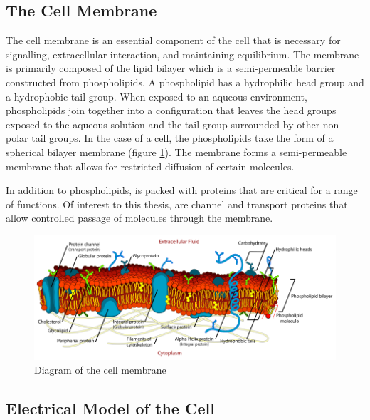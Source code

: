  \subsection{The Cell Membrane}
 \par The cell membrane is an essential component of the cell that is necessary for signalling, extracellular interaction, and maintaining equilibrium. The membrane is primarily composed of the lipid bilayer which is a semi-permeable barrier constructed from phospholipids. A phospholipid has a hydrophilic head group and a hydrophobic tail group. When exposed to an aqueous environment, phospholipids join together into a configuration that leaves the head groups exposed to the aqueous solution and the tail group surrounded by other non-polar tail groups. In the case of a cell, the phospholipids take the form of a spherical bilayer membrane (figure \ref{fig:cell_membrane}). The membrane forms a semi-permeable membrane that allows for restricted diffusion of certain molecules. 
 
 \par In addition to phospholipids, is packed with proteins that are critical for a range of functions. Of interest to this thesis, are channel and transport proteins that allow controlled passage of molecules through the membrane. 
 
 \begin{figure}[h]
    \centering
    \includegraphics[width=\textwidth]{images/Cell_membrane_detailed_diagram.png}
    \caption[Diagram of the cell membrane]{Diagram of the cell membrane \cite{mariana_ruiz_cell_????}}
    \label{fig:cell_membrane}
 \end{figure}
 
 
\subsection{Electrical Model of the Cell}

